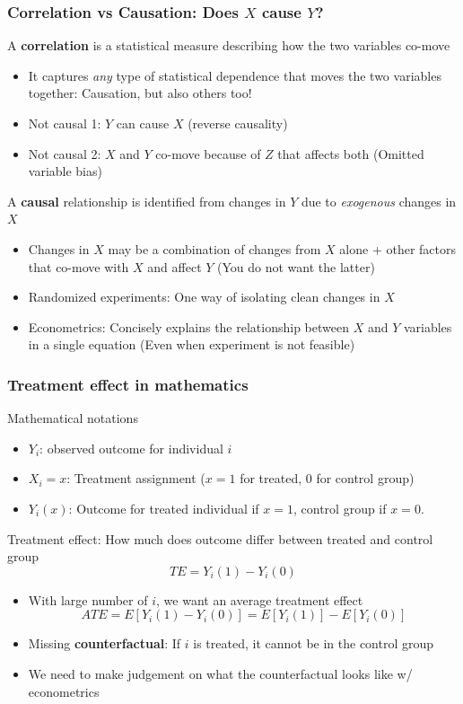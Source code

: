 \documentclass[aspectratio=169]{beamer}
\begin{document}
\begin{frame}
\frametitle{Correlation vs Causation: Does $X$ cause $Y$?}


 A \textbf{correlation} is a statistical measure describing how the two variables co-move
\begin{itemize}\setlength\itemsep{3pt}
\item It captures \textit{any} type of statistical dependence that moves the two variables together: Causation, but also others too!
\item Not causal 1: $Y$ can cause $X$ (reverse causality)
\item Not causal 2: $X$ and $Y$ co-move because of $Z$ that affects both (Omitted variable bias)
\end{itemize} \medskip
A \textbf{causal} relationship is identified from changes in $Y$ due to \textit{exogenous} changes in $X$
\begin{itemize}\setlength\itemsep{3pt}
\item Changes in $X$ may be a combination of changes from $X$ alone + other factors that co-move with $X$ and affect $Y$ (You do not want the latter)
\item Randomized experiments: One way of isolating clean changes in $X$ 
\item Econometrics: Concisely explains the relationship between $X$ and $Y$ variables in a single equation (Even when experiment is not feasible)
\end{itemize}
\end{frame}

\begin{frame}
\frametitle{Treatment effect in mathematics} 

 Mathematical notations
\begin{itemize}\setlength\itemsep{3pt}
  \item $Y_i$: observed outcome for individual $i$ %
  \item $X_i=x$: Treatment assignment ($x=1$ for treated, 0 for control group) 
  \item $Y_i(x)$: Outcome for treated individual if $x=1$, control group if $x=0$. 
\end{itemize}\medskip
Treatment effect: How much does outcome differ between treated and control group
\[
  TE = Y_i(1)-Y_i(0)
\]\vspace{-15pt}
\begin{itemize}\setlength\itemsep{3pt}
\item With large number of $i$, we want an average treatment effect
\[
ATE = E[Y_i(1)-Y_i(0)]=E[Y_i(1)]-E[Y_i(0)]
\]
\item Missing \textbf{counterfactual}: If $i$ is treated, it cannot be in the control group
\item We need to make judgement on what the counterfactual looks like w/ econometrics 
\end{itemize}\medskip
\end{frame}
\end{document}
